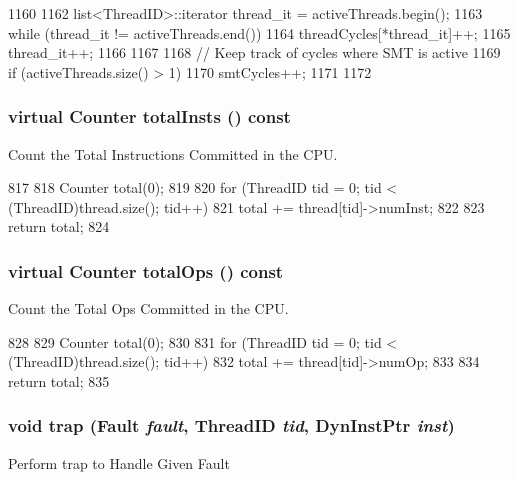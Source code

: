 \begin{DoxyCode}
1160 {
1162     list<ThreadID>::iterator thread_it = activeThreads.begin();
1163     while (thread_it != activeThreads.end()) {
1164         threadCycles[*thread_it]++;
1165         thread_it++;
1166     }
1167 
1168     // Keep track of cycles where SMT is active
1169     if (activeThreads.size() > 1) {
1170         smtCycles++;
1171     }
1172 }
\end{DoxyCode}
\hypertarget{classInOrderCPU_abdcc0de01ff3d8d22a40e0b966acb463}{
\subsubsection[{totalInsts}]{\setlength{\rightskip}{0pt plus 5cm}virtual {\bf Counter} totalInsts () const}}
\label{classInOrderCPU_abdcc0de01ff3d8d22a40e0b966acb463}
Count the Total Instructions Committed in the CPU. 


\begin{DoxyCode}
817     {
818         Counter total(0);
819 
820         for (ThreadID tid = 0; tid < (ThreadID)thread.size(); tid++)
821             total += thread[tid]->numInst;
822 
823         return total;
824     }
\end{DoxyCode}
\hypertarget{classInOrderCPU_adfb528b512cf037ade8dc8e22bf8a7bd}{
\subsubsection[{totalOps}]{\setlength{\rightskip}{0pt plus 5cm}virtual {\bf Counter} totalOps () const}}
\label{classInOrderCPU_adfb528b512cf037ade8dc8e22bf8a7bd}
Count the Total Ops Committed in the CPU. 


\begin{DoxyCode}
828     {
829         Counter total(0);
830 
831         for (ThreadID tid = 0; tid < (ThreadID)thread.size(); tid++)
832             total += thread[tid]->numOp;
833 
834         return total;
835     }
\end{DoxyCode}
\hypertarget{classInOrderCPU_abf76d6d245f7d3b17d26ea8dcc0cf36f}{
\subsubsection[{trap}]{\setlength{\rightskip}{0pt plus 5cm}void trap ({\bf Fault} {\em fault}, \/  {\bf ThreadID} {\em tid}, \/  {\bf DynInstPtr} {\em inst})}}
\label{classInOrderCPU_abf76d6d245f7d3b17d26ea8dcc0cf36f}
Perform trap to Handle Given Fault 


